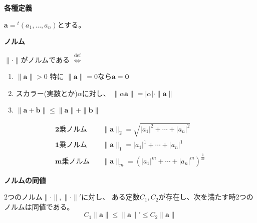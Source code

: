 \documentclass[10pt,b5paper]{ltjsarticle}
\begin{document}
\textbf{各種定義}

$\bm{a}={}^{t}(a_1,\dots,a_n)$とする。

\textbf{ノルム}

$\|\cdot\|$がノルムである
$\stackrel{\mathrm{def}}{\Leftrightarrow}$
\begin{enumerate}\renewcommand{\theenumi}{(\roman{enumi})}
 \item $\|\bm{a}\|>0$ 特に $\|\bm{a}\|=0$なら$\bm{a}=\bm{0}$
 \item スカラー(実数とか)$\alpha$に対し、
       $\|\alpha\bm{a}\|=\lvert\alpha\rvert\cdot\|\bm{a}\|$
 \item $\|\bm{a}+\bm{b}\|\leq \|\bm{a}\|+\|\bm{b}\|$
\end{enumerate}

\begin{align}
 \textbf{2乗ノルム}& \quad
 \|\bm{a}\|_{2}=\sqrt{\lvert a_{1}\rvert^{2}+\cdots+\lvert a_{n}\rvert^{2}}\\
 \textbf{1乗ノルム}& \quad
 \|\bm{a}\|_{1}=\lvert a_{1}\rvert^{1}+\cdots+\lvert a_{n}\rvert^{1}\\
 \textbf{m乗ノルム}& \quad
 \|\bm{a}\|_{m}=(\lvert a_{1}\rvert^{m}+\cdots+\lvert a_{n}\rvert^{m})^{\frac{1}{m}}
\end{align}

\textbf{ノルムの同値}

2つのノルム$\|\cdot\|, \|\cdot\|'$に対し、
ある定数$C_1, C_2$が存在し、次を満たす時2つのノルムは同値である。
\begin{equation}
 C_1 \| \bm{a} \| \leq \| \bm{a} \|' \leq C_2 \| \bm{a} \|
\end{equation}

\hrulefill
\end{document}
